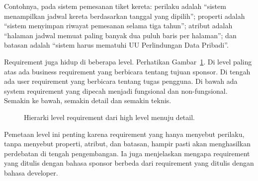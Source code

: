 \documentclass[11pt,a4paper]{article}
\begin{document}
Contohnya, pada sistem pemesanan tiket kereta: perilaku adalah ``sistem menampilkan jadwal kereta berdasarkan tanggal yang dipilih''; properti adalah ``sistem menyimpan riwayat pemesanan selama tiga tahun''; atribut adalah ``halaman jadwal memuat paling banyak dua puluh baris per halaman''; dan batasan adalah ``sistem harus mematuhi UU Perlindungan Data Pribadi''.

Requirement juga hidup di beberapa level. Perhatikan Gambar~\ref{fig:req-levels}. Di level paling atas ada business requirement yang berbicara tentang tujuan sponsor. Di tengah ada user requirement yang berbicara tentang tugas pengguna. Di bawah ada system requirement yang dipecah menjadi fungsional dan non-fungsional. Semakin ke bawah, semakin detail dan semakin teknis.

\begin{figure}[H]
	\centering
	\caption{Hierarki level requirement dari high level menuju detail.}
	\label{fig:req-levels}
\end{figure}

Pemetaan level ini penting karena requirement yang hanya menyebut perilaku, tanpa menyebut properti, atribut, dan batasan, hampir pasti akan menghasilkan perdebatan di tengah pengembangan. Ia juga menjelaskan mengapa requirement yang ditulis dengan bahasa sponsor berbeda dari requirement yang ditulis dengan bahasa developer.
\end{document}
